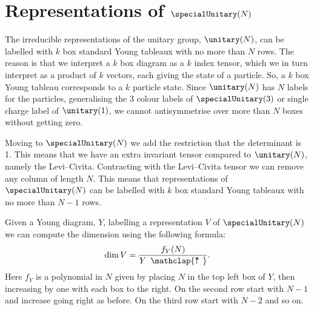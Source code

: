 \documentclass[fleqn]{NotesClass}
\newcommand{\hooknumber}[1]{#1{\phantom{?}\mkern1mu\mathclap{\ooalign{\hfil ? \hfil \cr \hfil ! \hfil}}}}
\begin{document}
    \section{Representations of \texorpdfstring{\(\specialUnitary(N)\)}{SU(N)}}
    The irreducible representations of the unitary group, \(\unitary(N)\), can be labelled with \(k\) box standard Young tableaux with no more than \(N\) rows.
    The reason is that we interpret a \(k\) box diagram as a \(k\) index tensor, which we in turn interpret as a product of \(k\) vectors, each giving the state of a particle.
    So, a \(k\) box Young tableau corresponds to a \(k\) particle state.
    Since \(\unitary(N)\) has \(N\) labels for the particles, generalising the 3 colour labels of \(\specialUnitary(3)\) or single charge label of \(\unitary(1)\), we cannot antisymmetrise over more than \(N\) boxes without getting zero.
    
    Moving to \(\specialUnitary(N)\) we add the restriction that the determinant is 1.
    This means that we have an extra invariant tensor compared to \(\unitary(N)\), namely the Levi--Civita.
    Contracting with the Levi--Civita tensor we can remove any column of length \(N\).
    This means that representations of \(\specialUnitary(N)\) can be labelled with \(k\) box standard Young tableaux with no more than \(N - 1\) rows.
    
    Given a Young diagram, \(Y\), labelling a representation \(V\) of \(\specialUnitary(N)\) we can compute the dimension using the following formula:
    \begin{equation}
        \dim V = \frac{f_Y(N)}{\hooknumber{Y}}.
    \end{equation}
    Here \(f_Y\) is a polynomial in \(N\) given by placing \(N\) in the top left box of \(Y\), then increasing by one with each box to the right.
    On the second row start with \(N - 1\) and increase going right as before.
    On the third row start with \(N - 2\) and so on.
    
\end{document}
